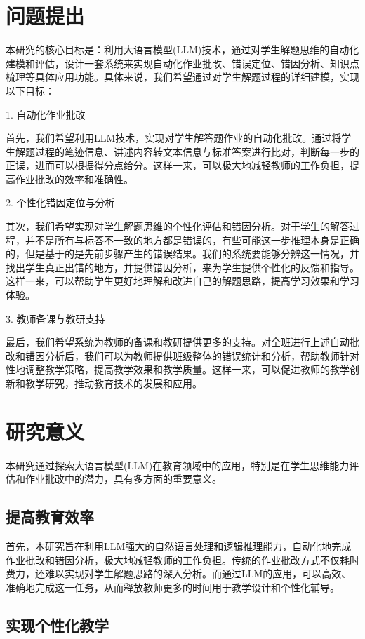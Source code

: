 \section{问题提出}

本研究的核心目标是：利用大语言模型(LLM)技术，通过对学生解题思维的自动化建模和评估，设计一套系统来实现自动化作业批改、错误定位、错因分析、知识点梳理等具体应用功能。具体来说，我们希望通过对学生解题过程的详细建模，实现以下目标：

1. 自动化作业批改

首先，我们希望利用LLM技术，实现对学生解答题作业的自动化批改。通过将学生解题过程的笔迹信息、讲述内容转文本信息与标准答案进行比对，判断每一步的正误，进而可以根据得分点给分。这样一来，可以极大地减轻教师的工作负担，提高作业批改的效率和准确性。

2. 个性化错因定位与分析

其次，我们希望实现对学生解题思维的个性化评估和错因分析。对于学生的解答过程，并不是所有与标答不一致的地方都是错误的，有些可能这一步推理本身是正确的，但是基于的是先前步骤产生的错误结果。我们的系统要能够分辨这一情况，并找出学生真正出错的地方，并提供错因分析，来为学生提供个性化的反馈和指导。这样一来，可以帮助学生更好地理解和改进自己的解题思路，提高学习效果和学习体验。

3. 教师备课与教研支持

最后，我们希望系统为教师的备课和教研提供更多的支持。对全班进行上述自动批改和错因分析后，我们可以为教师提供班级整体的错误统计和分析，帮助教师针对性地调整教学策略，提高教学效果和教学质量。这样一来，可以促进教师的教学创新和教学研究，推动教育技术的发展和应用。


\section{研究意义}
本研究通过探索大语言模型(LLM)在教育领域中的应用，特别是在学生思维能力评估和作业批改中的潜力，具有多方面的重要意义。

\subsection{提高教育效率}

首先，本研究旨在利用LLM强大的自然语言处理和逻辑推理能力，自动化地完成作业批改和错因分析，极大地减轻教师的工作负担。传统的作业批改方式不仅耗时费力，还难以实现对学生解题思路的深入分析。而通过LLM的应用，可以高效、准确地完成这一任务，从而释放教师更多的时间用于教学设计和个性化辅导。

\subsection{实现个性化教学}

